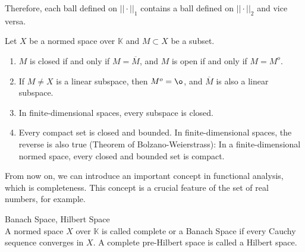 			Therefore, each ball defined on $||\cdot||_1$  contains a ball defined on $||\cdot||_2$ and vice versa.
			\begin{theorem}\label{the:app:functional:3}
				Let $X$ be a normed space over $\mathbb{K}$ and $M\subset X$ be a subset.
				\begin{enumerate}
					\item $M$ is closed if and only if $M=\overline{M}$, and $M$ is open if and only if $M=M^o$.
					\item If $M\neq X$ is a linear subspace, then $M^o=\o$, and $\overline{M}$ is also a linear subspace.
					\item In finite-dimensional spaces, every subspace is closed.
					\item Every compact set is closed and bounded. In finite-dimensional spaces, the reverse is also true (Theorem of Bolzano-Weierstrass): In a finite-dimensional normed space, every closed and bounded set is compact.
				\end{enumerate}
			\end{theorem}
		
			From now on, we can introduce an important concept in functional analysis, which is completeness. This concept is a crucial feature of the set of real numbers, for example.
			\begin{definition}\label{def:app:functional:5}
				Banach Space, Hilbert Space\\
				A normed space $X$ over $\mathbb{K}$ is called complete or a Banach Space if every Cauchy sequence converges in $X$. A complete pre-Hilbert space is called a Hilbert space.
			\end{definition}
		
